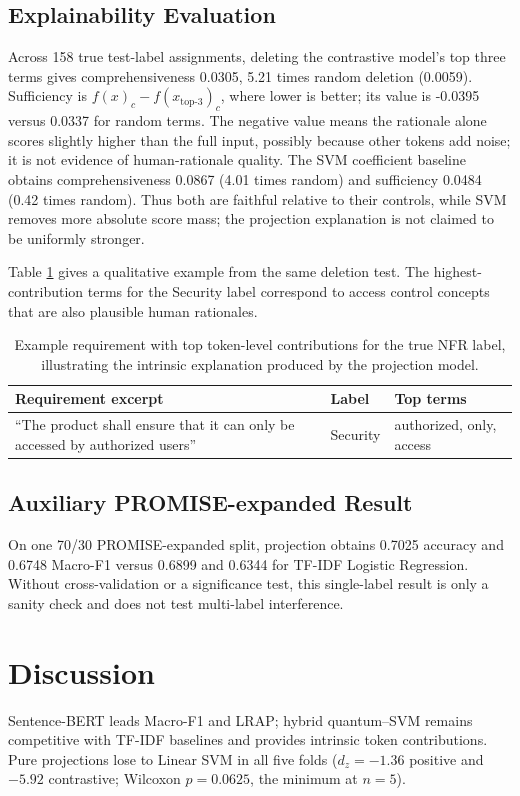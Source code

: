 \documentclass[runningheads]{llncs}
\begin{document}
\subsection{Explainability Evaluation}
Across 158 true test-label assignments, deleting the contrastive model's top
three terms gives comprehensiveness 0.0305, 5.21 times random deletion
(0.0059). Sufficiency is $f(x)_c-f(x_{\mathrm{top}\text{-}3})_c$, where lower
is better; its value is -0.0395 versus 0.0337 for random terms. The negative
value means the rationale alone scores slightly higher than the full input,
possibly because other tokens add noise; it is not evidence of human-rationale
quality. The SVM coefficient baseline obtains comprehensiveness 0.0867 (4.01
times random) and sufficiency 0.0484 (0.42 times random). Thus both are
faithful relative to their controls, while SVM removes more absolute score
mass; the projection explanation is not claimed to be uniformly stronger.

Table \ref{tab:qualitative} gives a qualitative example from the same deletion
test. The highest-contribution terms for the Security label correspond to access
control concepts that are also plausible human rationales.

\begin{table}[htbp]
\centering
\caption{Example requirement with top token-level contributions for the true NFR label, illustrating the intrinsic explanation produced by the projection model.}
\label{tab:qualitative}
\begin{tabular}{p{}p{}p{}}
\toprule
Requirement excerpt & Label & Top terms \\
\midrule
``The product shall ensure that it can only be accessed by authorized users'' & Security & authorized, only, access \\
\bottomrule
\end{tabular}
\end{table}

\subsection{Auxiliary PROMISE-expanded Result}
On one 70/30 PROMISE-expanded split, projection obtains 0.7025 accuracy and
0.6748 Macro-F1 versus 0.6899 and 0.6344 for TF-IDF Logistic Regression.
Without cross-validation or a significance test, this single-label result is
only a sanity check and does not test multi-label interference.

\section{Discussion}
Sentence-BERT leads Macro-F1 and LRAP; hybrid quantum--SVM remains competitive
with TF-IDF baselines and provides intrinsic token contributions. Pure
projections lose to Linear SVM in all five folds ($d_z=-1.36$ positive and
$-5.92$ contrastive; Wilcoxon $p=0.0625$, the minimum at $n=5$).
\end{document}
